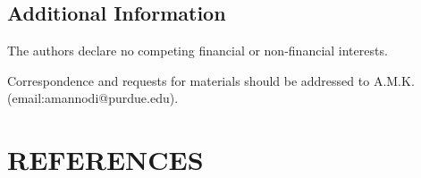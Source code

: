 \documentclass[11pt]{article}
\begin{document}
\subsection{Additional Information}
\label{sec:orgbc6ab16}
The authors declare no competing financial or non-financial interests.

Correspondence and requests for materials should be addressed to A.M.K.
(email:amannodi@purdue.edu).

\section{REFERENCES}
\label{sec:orga2443e3}


\end{document}
